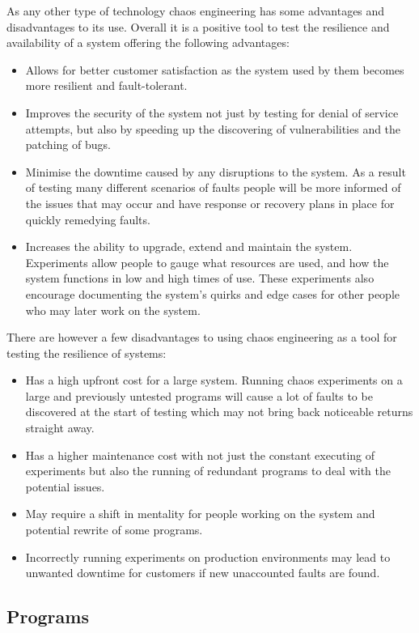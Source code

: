 \documentclass[conference]{IEEEtran}
\begin{document}
As any other type of technology chaos engineering has some advantages and disadvantages to its use. Overall it is a positive tool to test the resilience and availability of a system offering the following advantages:
\begin{itemize}
	\item Allows for better customer satisfaction as the system used by them becomes more resilient and fault-tolerant.
	\item Improves the security of the system not just by testing for denial of service attempts, but also by speeding up the discovering of vulnerabilities and the patching of bugs.
	\item Minimise the downtime caused by any disruptions to the system. As a result of testing many different scenarios of faults people will be more informed of the issues that may occur and have response or recovery plans in place for quickly remedying faults.
	\item Increases the ability to upgrade, extend and maintain the system. Experiments allow people to gauge what resources are used, and how the system functions in low and high times of use. These experiments also encourage documenting the system's quirks and edge cases for other people who may later work on the system.
\end{itemize}
There are however a few disadvantages to using chaos engineering as a tool for testing the resilience of systems:
\begin{itemize}
	\item Has a high upfront cost for a large system. Running chaos experiments on a large and previously untested programs will cause a lot of faults to be discovered at the start of testing which may not bring back noticeable returns straight away. 
	\item Has a higher maintenance cost with not just the constant executing of experiments but also the running of redundant programs to deal with the potential issues.
	\item May require a shift in mentality for people working on the system and potential rewrite of some programs.
	\item Incorrectly running experiments on production environments may lead to unwanted downtime for customers if new unaccounted faults are found. \cite{b2}
\end{itemize}

\subsection{Programs}
\end{document}
